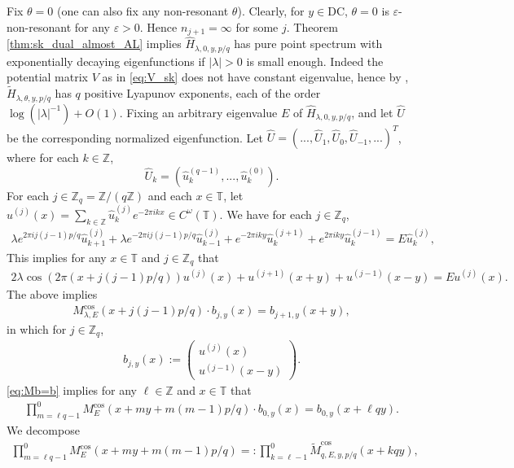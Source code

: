 \documentclass[11pt]{amsart}
\newcommand{\Z}{\mathbb Z}
\newcommand{\T}{\mathbb T}
\begin{document}
Fix $\theta=0$ (one can also fix any non-resonant $\theta$). Clearly, for $y\in \mathrm{DC}$, $\theta=0$ is $\varepsilon$-non-resonant for any $\varepsilon>0$. Hence $n_{j+1}=\infty$ for some $j$. Theorem \ref{thm:sk_dual_almost_AL} implies $\widehat{H}_{\lambda,0,y,p/q}$ has pure point spectrum with exponentially decaying eigenfunctions if $|\lambda|>0$ is small enough. Indeed the potential matrix $V$ as in \eqref{eq:V_sk} does not have constant eigenvalue, hence by \cite[Theorem 2.3]{DK1}, $\widetilde{H}_{\lambda,\theta,y,p/q}$ has $q$ positive Lyapunov exponents, each of the order $\log (|\lambda|^{-1})+O(1)$.
Fixing an arbitrary eigenvalue $E$ of $\widehat{H}_{\lambda,0,y,p/q}$, and let $\hat{U}$ be the corresponding normalized eigenfunction. 
Let $\hat{U}=(...,\hat{U}_{1}, \hat{U}_0, \hat{U}_{-1},...)^T$, where for each $k\in \Z$,
\[\hat{U}_k=(\hat{u}_k^{(q-1)},...,\hat{u}_k^{(0)}).\]
For each $j\in \Z_q=\Z/(q\Z)$ and each $x\in \T$, let 
$u^{(j)}(x)=\sum_{k\in \Z} \hat{u}^{(j)}_k e^{-2\pi i kx}\in C^{\omega}(\T)$.
We have for each $j\in \Z_q$,
\begin{align}
    \lambda e^{2\pi i j(j-1)p/q} \hat{u}^{(j)}_{k+1}+\lambda e^{-2\pi i j(j-1)p/q} \hat{u}^{(j)}_{k-1}+e^{-2\pi i ky}\hat{u}^{(j+1)}_k+e^{2\pi i ky}\hat{u}^{(j-1)}_k=E\hat{u}^{(j)}_k,
\end{align}
This implies for any $x\in \T$ and $j\in \Z_q$ that 
\begin{align}
    2\lambda \cos(2\pi (x+j(j-1)p/q)) u^{(j)}(x)+u^{(j+1)}(x+y)+u^{(j-1)}(x-y)=Eu^{(j)}(x).
\end{align}
The above implies 
\begin{align}\label{eq:Mb=b}
    M_{\lambda,E}^{\cos}(x+j(j-1)p/q)\cdot b_{j,y}(x)=b_{j+1,y}(x+y),
\end{align}
in which for $j\in \Z_q$,
\begin{align}
    b_{j,y}(x):=\left(\begin{matrix} u^{(j)}(x)\\ u^{(j-1)}(x-y)\end{matrix}\right).
\end{align}
\eqref{eq:Mb=b} implies for any $\ell\in \Z$ and $x\in \T$ that
\begin{align}
    \prod_{m=\ell q-1}^{0}M_E^{\cos}(x+m y+m(m-1)p/q) \cdot b_{0, y}(x)=b_{0,y}(x+\ell q y).
\end{align}
We decompose
\begin{align}\label{eq:M_lq=tM_l}
    \prod_{m=\ell q-1}^{0}M_E^{\cos}(x+m y+m(m-1)p/q)
    =:\prod_{k=\ell-1}^{0} \widetilde{M}^{\cos}_{q,E,y,p/q}(x+kqy),
\end{align}
\end{document}
